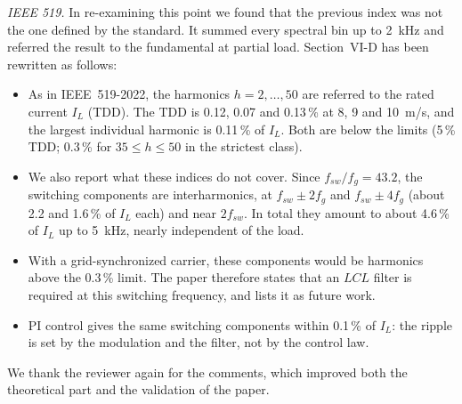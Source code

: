 \documentclass[11pt,a4paper]{article}
\begin{document}
\emph{IEEE 519.} In re-examining this point we found that the previous index was not the one defined
by the standard. It summed every spectral bin up to 2~kHz and referred the result to the fundamental at
partial load. Section~VI-D has been rewritten as follows:
\begin{itemize}
\item As in IEEE~519-2022, the harmonics $h=2,\dots,50$ are referred to the rated current $I_L$ (TDD).
The TDD is 0.12, 0.07 and 0.13\,\% at 8, 9 and 10~m/s, and the largest individual harmonic is 0.11\,\%
of $I_L$. Both are below the limits (5\,\% TDD; 0.3\,\% for $35\le h\le50$ in the strictest class).
\item We also report what these indices do not cover. Since $f_{sw}/f_g=43.2$, the switching components
are interharmonics, at $f_{sw}\pm2f_g$ and $f_{sw}\pm4f_g$ (about 2.2 and 1.6\,\% of $I_L$ each) and
near $2f_{sw}$. In total they amount to about 4.6\,\% of $I_L$ up to 5~kHz, nearly independent of the load.
\item With a grid-synchronized carrier, these components would be harmonics above the 0.3\,\% limit.
The paper therefore states that an $LCL$ filter is required at this switching frequency, and lists it
as future work.
\item PI control gives the same switching components within 0.1\,\% of $I_L$: the ripple is set by the
modulation and the filter, not by the control law.
\end{itemize}

\medskip
We thank the reviewer again for the comments, which improved both the theoretical part and the
validation of the paper.
\end{document}
